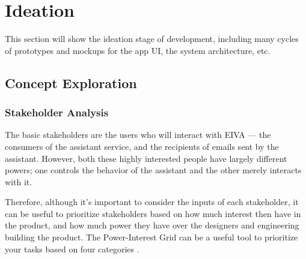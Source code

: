 \documentclass{article}
\begin{document}
\newpage

\section{Ideation}

This section will show the ideation stage of development, including many cycles of prototypes and mockups for the app UI, the system architecture, etc.

\subsection{Concept Exploration}

\subsubsection{Stakeholder Analysis}

The basic stakeholders are the users who will interact with EIVA --- the consumers of the assistant service, and the recipients of emails sent by the assistant. However, both these highly interested people have largely different powers; one controls the behavior of the assistant and the other merely interacts with it.

Therefore, although it's important to consider the inputs of each stakeholder, it can be useful to prioritize stakeholders based on how much interest then have in the product, and how much power they have over the designers and engineering building the product. The Power-Interest Grid can be a useful tool to prioritize your tasks based on four categories \cite{noauthor_stakeholder_nodate}.
\end{document}
